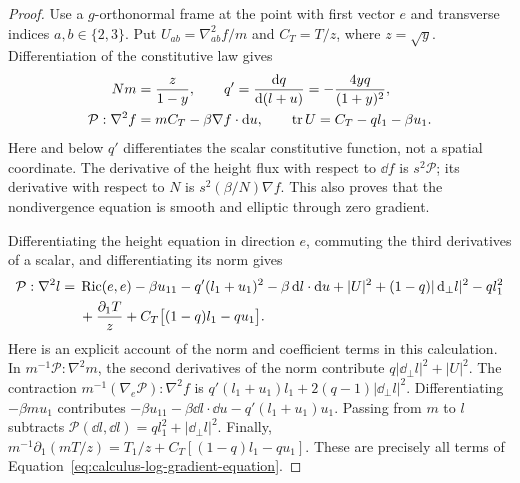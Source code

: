 \begin{proof}
Use a $g$-orthonormal frame at the point with first vector $e$ and
transverse indices $a,b\in\{2,3\}$.  Put
$U_{ab}=\nabla^2_{ab}f/m$ and $C_T=T/z$, where $z=\sqrt y$.
Differentiation of the constitutive law gives
\begin{equation}
 \begin{aligned}
 Nm&=\frac z{1-y},\qquad
 q'=\frac{\mathop{}\!\mathrm d q}{\mathop{}\!\mathrm d(l+u)}=-\frac{4yq}{(1+y)^2},\\
 \mathcal P:\nabla^2f&=mC_T-\beta\nabla f\cdot\mathop{}\!\mathrm d u,
 \qquad \operatorname{tr} U=C_T-ql_1-\beta u_1.
 \end{aligned}
 \label{eq:calculus-height-nondivergence}
\end{equation}
Here and below $q'$ differentiates the scalar constitutive function,
not a spatial coordinate.  The derivative of the height flux with
respect to $\dd f$ is $s^2\mathcal P$; its derivative with respect to
$N$ is $s^2(\beta/N)\nabla f$.  This also proves that the
nondivergence equation is smooth and elliptic through zero gradient.

Differentiating the height equation in direction $e$, commuting the
third derivatives of a scalar, and differentiating its norm gives
\begin{align}
 \mathcal P:\nabla^2l={}&\operatorname{Ric}(e,e)-\beta u_{11}
   -q'(l_1+u_1)^2-\beta\mathop{}\!\mathrm d l\cdot\mathop{}\!\mathrm d u
   +|U|^2+(1-q)|\mathop{}\!\mathrm d_\perp l|^2-ql_1^2 \notag\\
 &+\frac{\partial_1T}{z}
        +C_T\bigl[(1-q)l_1-qu_1\bigr].
 \label{eq:calculus-log-gradient-equation}
\end{align}
Here is an explicit account of the norm and coefficient terms in this
calculation.  In $m^{-1}\mathcal P:\nabla^2m$, the second derivatives
of the norm contribute $q|\dd_\perp l|^2+|U|^2$.
The contraction $m^{-1}(\nabla_e\mathcal P):\nabla^2f$ is
$q'(l_1+u_1)l_1+2(q-1)|\dd_\perp l|^2$.
Differentiating $-\beta m u_1$ contributes
$-\beta u_{11}-\beta\dd l\cdot\dd u
-q'(l_1+u_1)u_1$.
Passing from $m$ to $l$ subtracts
$\mathcal P(\dd l,\dd l)=ql_1^2+|\dd_\perp l|^2$.
Finally,
$m^{-1}\partial_1(mT/z)=T_1/z+C_T[(1-q)l_1-qu_1]$.
These are precisely all terms of
Equation~\eqref{eq:calculus-log-gradient-equation}.


\end{proof}
